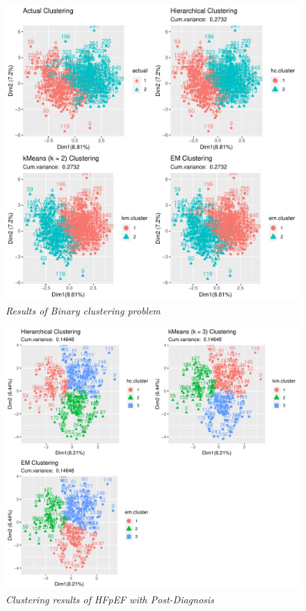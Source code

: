 \documentclass[../thesis.tex]{subfiles}
\begin{document}
\begin{figure}[h!]
    \centering
    \hspace*{-1cm}\includegraphics[width=1.1\textwidth]{doc/thesis/images/ClustFull.pdf}
    \caption[Clustering results: Binary clustering problem]{\textit{Results of Binary clustering problem}}
    \label{fig:bi_clust_results}
\end{figure}

\newpage

\begin{figure}[h!]
    \centering
    \hspace*{-1cm}\includegraphics[width=1.1\textwidth]{doc/thesis/images/ClustpPhy.pdf}
    \caption[Clustering results: HFpEF with Post-Diagnosis]{\textit{Clustering results of HFpEF with Post-Diagnosis}}
    \label{fig:clust_results_with_post_p}
\end{figure}
\end{document}
